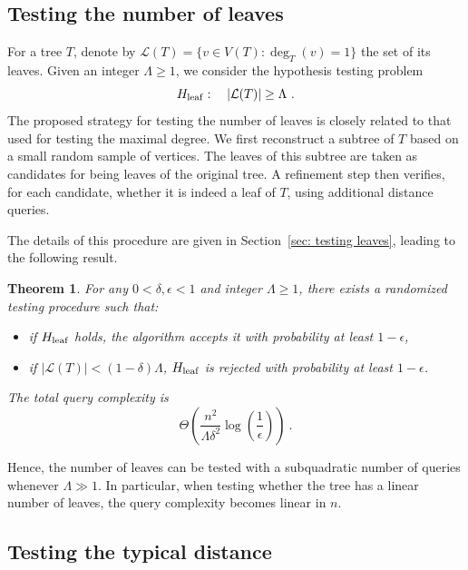 \documentclass[12pt]{article}
\newtheorem{theorem}{Theorem}[section]
\begin{document}
\subsection{Testing the number of leaves}

For a tree $T$, denote by
$
\mathcal{L}(T) = \{v \in V(T) : \deg_T(v) = 1\}
$ 
the set of its leaves.
Given an integer $\Lambda \ge 1$, we consider the hypothesis testing problem
\[
H_{\rm leaf}: \quad |\mathcal{L}(T)| \ge \Lambda~.
\]
The proposed strategy for testing the number of leaves is closely related to that used for testing the maximal degree.
We first reconstruct a subtree of $T$ based on a small random sample of vertices.
The leaves of this subtree are taken as candidates for being leaves of the original tree.
A refinement step then verifies, for each candidate, whether it is indeed a leaf of $T$, using additional distance queries.

The details of this procedure are given in Section~\ref{sec: testing leaves}, leading to the following result.
\begin{theorem}\label{thm: leaves test}
For any $0<\delta,\epsilon<1$ and integer $\Lambda \ge 1$, there exists a randomized testing procedure such that:
\begin{itemize}
    \item [(i)] if $H_{\rm leaf}$ holds, the algorithm accepts it with probability at least $1-\epsilon$,
    \item [(ii)] if $|\mathcal{L}(T)| < (1-\delta)\Lambda$, $H_{\rm leaf}$ is rejected with probability at least $1-\epsilon$.
\end{itemize}
The total query complexity is
\[
\Theta\!\left(
\frac{n^2}{\Lambda\delta^2}
\log\!\left(\frac{1}{\epsilon}\right)
\right)~.
\]
\end{theorem}


\noindent
Hence, the number of leaves can be tested with a subquadratic number of queries whenever $\Lambda \gg 1$.
In particular, when testing whether the tree has a linear number of leaves, the query complexity becomes linear in $n$.


\subsection{Testing the typical distance}
\end{document}
